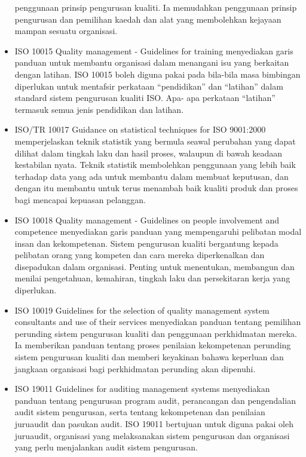 \documentclass[
]{article}
\begin{document}
\begin{itemize}
  penggunaan prinsip pengurusan kualiti. Ia memudahkan penggunaan
  prinsip pengurusan dan pemilihan kaedah dan alat yang membolehkan
  kejayaan mampan sesuatu organisasi.
\item
  ISO 10015 Quality management - Guidelines for training menyediakan
  garis panduan untuk membantu organisasi dalam menangani isu yang
  berkaitan dengan latihan. ISO 10015 boleh diguna pakai pada bila-bila
  masa bimbingan diperlukan untuk mentafsir perkataan ``pendidikan'' dan
  ``latihan'' dalam standard sistem pengurusan kualiti ISO. Apa- apa
  perkataan ``latihan'' termasuk semua jenis pendidikan dan latihan.
\item
  ISO/TR 10017 Guidance on statistical techniques for ISO 9001:2000
  memperjelaskan teknik statistik yang bermula seawal perubahan yang
  dapat dilihat dalam tingkah laku dan hasil proses, walaupun di bawah
  keadaan kestabilan nyata. Teknik statistik membolehkan penggunaan yang
  lebih baik terhadap data yang ada untuk membantu dalam membuat
  keputusan, dan dengan itu membantu untuk terus menambah baik kualiti
  produk dan proses bagi mencapai kepuasan pelanggan.
\item
  ISO 10018 Quality management - Guidelines on people involvement and
  competence menyediakan garis panduan yang mempengaruhi pelibatan modal
  insan dan kekompetenan. Sistem pengurusan kualiti bergantung kepada
  pelibatan orang yang kompeten dan cara mereka diperkenalkan dan
  disepadukan dalam organisasi. Penting untuk menentukan, membangun dan
  menilai pengetahuan, kemahiran, tingkah laku dan persekitaran kerja
  yang diperlukan.
\item
  ISO 10019 Guidelines for the selection of quality management system
  consultants and use of their services menyediakan panduan tentang
  pemilihan perunding sistem pengurusan kualiti dan penggunaan
  perkhidmatan mereka. Ia memberikan panduan tentang proses penilaian
  kekompetenan perunding sistem pengurusan kualiti dan memberi keyakinan
  bahawa keperluan dan jangkaan organisasi bagi perkhidmatan perunding
  akan dipenuhi.
\item
  ISO 19011 Guidelines for auditing management systems menyediakan
  panduan tentang pengurusan program audit, perancangan dan pengendalian
  audit sistem pengurusan, serta tentang kekompetenan dan penilaian
  juruaudit dan pasukan audit. ISO 19011 bertujuan untuk diguna pakai
  oleh juruaudit, organisasi yang melaksanakan sistem pengurusan dan
  organisasi yang perlu menjalankan audit sistem pengurusan.
\end{itemize}
\end{document}
